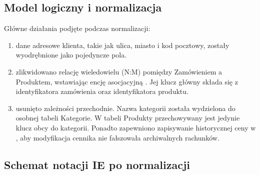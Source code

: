 \documentclass[letterpaper,10pt,polish]{sphinxmanual}
\begin{document}
\subsection{Model logiczny i normalizacja}
\label{\detokenize{rozdzial_3/index:model-logiczny-i-normalizacja}}
\sphinxAtStartPar
Główne działania podjęte podczas normalizacji:
\begin{enumerate}
%
\item {} 
\sphinxAtStartPar
{} dane adresowe klienta, takie jak ulica, miasto i kod pocztowy, zostały wyodrębnione jako pojedyncze pola.

\item {} 
\sphinxAtStartPar
{} zlikwidowano relację wiele\sphinxhyphen{}do\sphinxhyphen{}wielu (N:M) pomiędzy Zamówieniem a Produktem, wstawiając encję asocjacyjną . Jej klucz główny składa się z identyfikatora zamówienia oraz identyfikatora produktu.

\item {} 
\sphinxAtStartPar
{} usunięto zależności przechodnie. Nazwa kategorii została wydzielona do osobnej tabeli Kategorie. W tabeli Produkty przechowywany jest jedynie klucz obcy do kategorii. Ponadto zapewniono zapisywanie historycznej ceny w , aby modyfikacja cennika nie fałszowała archiwalnych rachunków.

\end{enumerate}


\subsection{Schemat notacji IE po normalizacji}
\label{\detokenize{rozdzial_3/index:schemat-notacji-ie-po-normalizacji}}\begin{quote}

\noindent{}
\end{quote}

\sphinxstepscope



\renewcommand{\indexname}{Indeks}
\printindex
\end{document}
